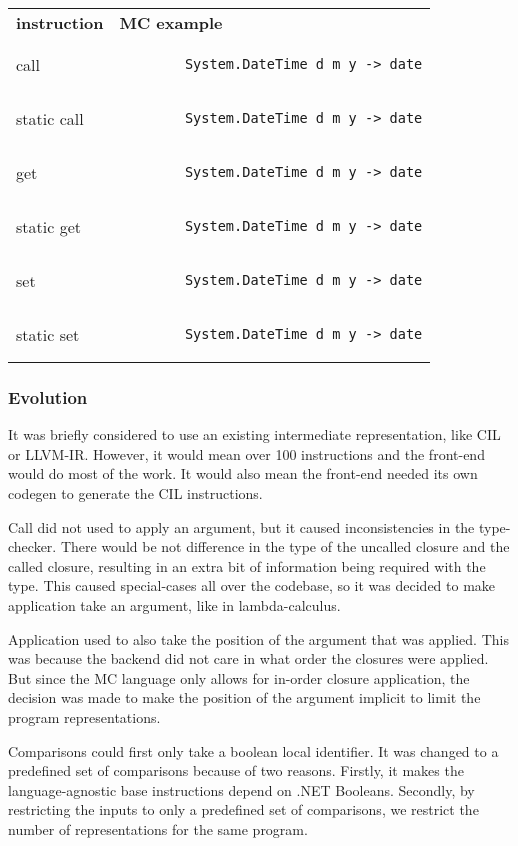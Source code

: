 \begin{tabular}{ll}
    \textbf{instruction} & \textbf{MC example}\\
    call & \begin{lstlisting}
        System.DateTime d m y -> date
    \end{lstlisting}\\
    static call & \begin{lstlisting}
        System.DateTime d m y -> date
    \end{lstlisting}\\
    get & \begin{lstlisting}
        System.DateTime d m y -> date
    \end{lstlisting}\\
    static get & \begin{lstlisting}
        System.DateTime d m y -> date
    \end{lstlisting}\\
    set & \begin{lstlisting}
        System.DateTime d m y -> date
    \end{lstlisting}\\
    static set & \begin{lstlisting}
        System.DateTime d m y -> date
    \end{lstlisting}\\
\end{tabular}

\subsubsection{Evolution}
It was briefly considered to use an existing intermediate representation, like CIL or LLVM-IR.
However, it would mean over 100 instructions and the front-end would do most of the work.
It would also mean the front-end needed its own codegen to generate the CIL instructions.

Call did not used to apply an argument, but it caused inconsistencies in the type-checker.
There would be not difference in the type of the uncalled closure and the called closure, resulting in an extra bit of information being required with the type.
This caused special-cases all over the codebase, so it was decided to make application take an argument, like in lambda-calculus.

Application used to also take the position of the argument that was applied.
This was because the backend did not care in what order the closures were applied.
But since the MC language only allows for in-order closure application, the decision was made to make the position of the argument implicit to limit the program representations.

Comparisons could first only take a boolean local identifier.
It was changed to a predefined set of comparisons because of two reasons.
Firstly, it makes the language-agnostic base instructions depend on .NET Booleans.
Secondly, by restricting the inputs to only a predefined set of comparisons, we restrict the number of representations for the same program.

